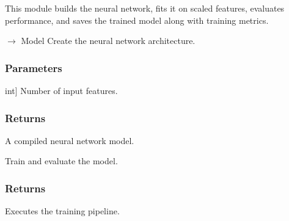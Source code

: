 \documentclass[letterpaper,10pt,english]{sphinxmanual}
\begin{document}
\sphinxAtStartPar
This module builds the neural network, fits it on scaled features, evaluates
performance, and saves the trained model along with training metrics.

\begin{fulllineitems}
\label{\detokenize{modules:asteroid_impact.modeling.predict.build_model}}
\pysigstartsignatures
\pysiglinewithargsret
{}
{}
{{ $\rightarrow$ Model}}
\pysigstopsignatures
\sphinxAtStartPar
Create the neural network architecture.


\subsubsection{Parameters}
\label{\detokenize{modules:id12}}\begin{description}
\sphinxlineitem{input\_shape}{[}int{]}
\sphinxAtStartPar
Number of input features.

\end{description}


\subsubsection{Returns}
\label{\detokenize{modules:id13}}\begin{description}
\sphinxAtStartPar
A compiled neural network model.

\end{description}

\end{fulllineitems}


\begin{fulllineitems}
\label{\detokenize{modules:asteroid_impact.modeling.predict.main}}
\pysigstartsignatures
\pysiglinewithargsret
{}
{}
{}
\pysigstopsignatures
\sphinxAtStartPar
Train and evaluate the model.


\subsubsection{Returns}
\label{\detokenize{modules:id14}}\begin{description}
\sphinxAtStartPar
Executes the training pipeline.

\end{description}

\end{fulllineitems}
\end{document}
